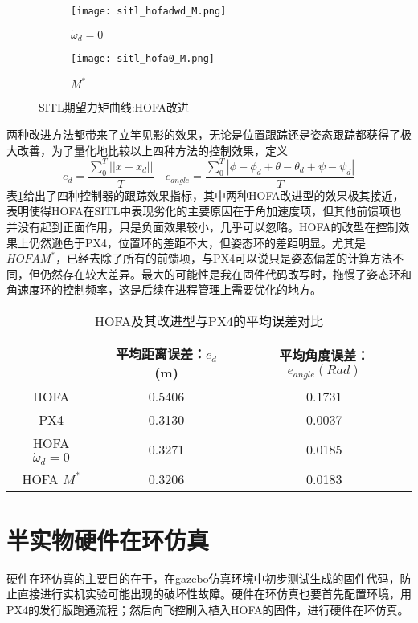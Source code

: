 \begin{figure}[H]
  \centering
\begin{subfigure}[b]{0.49\linewidth}
    \texttt{[image: sitl\_hofadwd\_M.png]}
    \caption{$\dot \omega_d =0$}
\end{subfigure}
\hfill
\begin{subfigure}[b]{0.49\linewidth}
    \texttt{[image: sitl\_hofa0\_M.png]}
    \caption{$M^*$}
\end{subfigure}
\caption{SITL期望力矩曲线:HOFA改进}
\label{SITL期望力矩曲线:HOFA改进}
\end{figure}

两种改进方法都带来了立竿见影的效果，无论是位置跟踪还是姿态跟踪都获得了极大改善，为了量化地比较以上四种方法的控制效果，定义
$$e_d=\frac{\sum_0^{T}||x-x_d||}{T} \quad e_{angle}=\frac{\sum_0^{T}|\phi-\phi_d+\theta-\theta_d+\psi-\psi_d|}{T}$$
表\ref{HOFA改}给出了四种控制器的跟踪效果指标，其中两种HOFA改进型的效果极其接近，表明使得HOFA在SITL中表现劣化的主要原因在于角加速度项，但其他前馈项也并没有起到正面作用，只是负面效果较小，几乎可以忽略。HOFA的改型在控制效果上仍然逊色于PX4，位置环的差距不大，但姿态环的差距明显。尤其是$HOFA M^*$，已经去除了所有的前馈项，与PX4可以说只是姿态偏差的计算方法不同，但仍然存在较大差异。最大的可能性是我在固件代码改写时，拖慢了姿态环和角速度环的控制频率，这是后续在进程管理上需要优化的地方。
\begin{table}[H]
  \centering
  \caption{HOFA及其改进型与PX4的平均误差对比}
  \label{HOFA改}
  \begin{tabular}{ccc}
      \toprule
      & 平均距离误差：$e_d$ (m)& 平均角度误差：$e_{angle}(Rad)$  \\
      \midrule
      HOFA &0.5406  & 0.1731\\
      PX4 & 0.3130 &  0.0037\\
      HOFA $\dot \omega_d=0$ & 0.3271 & 0.0185\\
      HOFA $M^*$ &0.3206  & 0.0183\\
      \bottomrule
  \end{tabular}
\end{table}

\section{半实物硬件在环仿真}
硬件在环仿真的主要目的在于，在gazebo仿真环境中初步测试生成的固件代码，防止直接进行实机实验可能出现的破坏性故障。硬件在环仿真也要首先配置环境，用PX4的发行版跑通流程；然后向飞控刷入植入HOFA的固件，进行硬件在环仿真。
